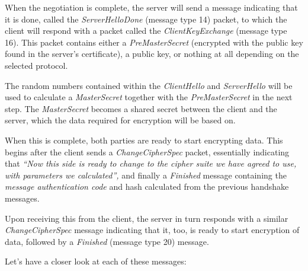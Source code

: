 When the negotiation is complete, the server will send a message indicating that it is done, called the \textit{ServerHelloDone} (message type 14) packet, to which the client will respond with a packet called the \textit{ClientKeyExchange}\cite{rfcClientKeyExchange,rfcSSLClientKeyExchange} (message type 16). This packet contains either a \textit{PreMasterSecret }\cite{rfcSSLPreMasterSecret} (encrypted with the public key found in the server's certificate), a public key, or nothing at all depending on the selected protocol\cite{rfcCipherSuiteDefinition,rfcCipherSuiteList}.

The random numbers contained within the \textit{ClientHello}\cite{rfcClientHello,rfcSSLClientHello} and \textit{ServerHello}\cite{rfcServerHello,rfcSSLServerHello} will be used to calculate a \textit{MasterSecret} together with the \textit{PreMasterSecret }in the next step. The \textit{MasterSecret} becomes a shared secret between the client and the server, which the data required for encryption will be based on.

When this is complete, both parties are ready to start encrypting data. This begins after the client sends a \textit{ChangeCipherSpec}\cite{rfcChangeCipherSpecProtocol,rfcSSLChangeCipherSpecProtocol} packet, essentially indicating that \textit{{\textquotedblleft}Now this side is ready to change to the cipher suite we have agreed to use, with parameters we calculated{\textquotedblright}, }and finally a \textit{Finished}\cite{rfcFinished,rfcSSLFinished} message containing the \textit{message authentication code}\cite{rfcSSLMAC} and hash calculated from the previous handshake messages.

Upon receiving this from the client, the server in turn responds with a similar \textit{ChangeCipherSpec} message indicating that it, too, is ready to start encryption of data, followed by a \textit{Finished} (message type 20) message.

Let's have a closer look at each of these messages:

